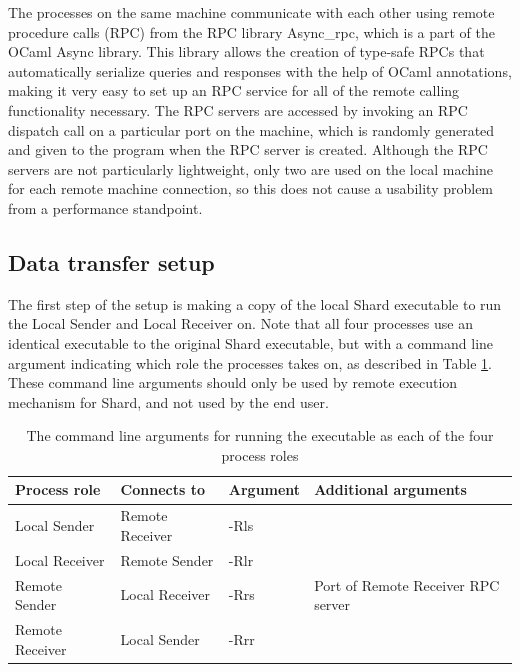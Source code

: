 \documentclass[twoside]{report}
\begin{document}
The processes on the same machine communicate with each other using remote procedure calls (RPC) from the RPC library Async\_rpc, which is a part of the OCaml Async library.
This library allows the creation of type-safe RPCs that automatically serialize queries and responses with the help of OCaml annotations, making it very easy to set up an RPC service for all of the remote calling functionality necessary.
The RPC servers are accessed by invoking an RPC dispatch call on a particular port on the machine, which is randomly generated and given to the program when the RPC server is created.
Although the RPC servers are not particularly lightweight, only two are used on the local machine for each remote machine connection, so this does not cause a usability problem from a performance standpoint.

\subsection{Data transfer setup}

The first step of the setup is making a copy of the local Shard executable to run the Local Sender and Local Receiver on.
Note that all four processes use an identical executable to the original Shard executable, but with a command line argument indicating which role the processes takes on, as described in Table \ref{fig:process_role_args}.
These command line arguments should only be used by remote execution mechanism for Shard, and not used by the end user.

\begin{table}[h]
  \begin{center}
    \begin{tabular}{|l|l|l|l|}
      \hline
      Process role    & Connects to     & Argument & Additional arguments               \\ \hline
      Local Sender    & Remote Receiver & -Rls     &                                    \\ \hline
      Local Receiver  & Remote Sender   & -Rlr     &                                    \\ \hline
      Remote Sender   & Local Receiver  & -Rrs     & Port of Remote Receiver RPC server \\ \hline
      Remote Receiver & Local Sender    & -Rrr     &                                    \\ \hline
    \end{tabular}
    \caption{The command line arguments for running the executable as each of the four process roles}
    \label{fig:process_role_args}
  \end{center}
\end{table}
\end{document}
